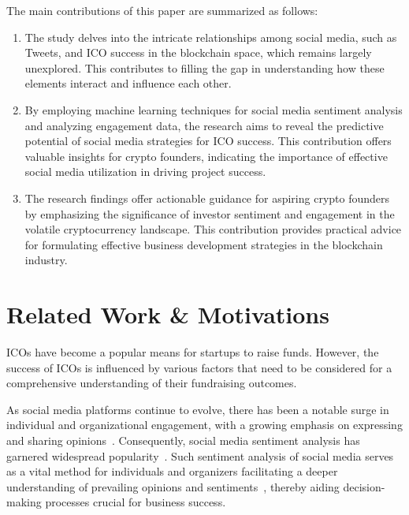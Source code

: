 \documentclass[runningheads]{llncs}
\begin{document}
The main contributions of this paper are summarized as follows:
\begin{enumerate}
    \item The study delves into the intricate relationships among social media, such as Tweets, and ICO success in the blockchain space, which remains largely unexplored. This contributes to filling the gap in understanding how these elements interact and influence each other.
    
     \item By employing machine learning techniques for social media sentiment analysis and analyzing engagement data, the research aims to reveal the predictive potential of social media strategies for ICO success. This contribution offers valuable insights for crypto founders, indicating the importance of effective social media utilization in driving project success.
     
    \item The research findings offer actionable guidance for aspiring crypto founders by emphasizing the significance of investor sentiment and engagement in the volatile cryptocurrency landscape. This contribution provides practical advice for formulating effective business development strategies in the blockchain industry.
\end{enumerate}



\section{Related Work \& Motivations}
ICOs have become a popular means for startups to raise funds. However, the success of ICOs is influenced by various factors that need to be considered for a comprehensive understanding of their fundraising outcomes. 

As social media platforms continue to evolve, there has been a notable surge in individual and organizational engagement, with a growing emphasis on expressing and sharing opinions~\cite {fu2013social,chen2020comparing}. Consequently, social media sentiment analysis has garnered widespread popularity~\cite {wang2014enhancing,wang2023mimusa,teo2023knowledge}. Such sentiment analysis of social media serves as a vital method for individuals and organizers facilitating a deeper understanding of prevailing opinions and sentiments~\cite {wang2014anomaly,wang2014issues,hu2023msrl,wang2023learning}, thereby aiding  decision-making processes crucial for business success.
\end{document}
